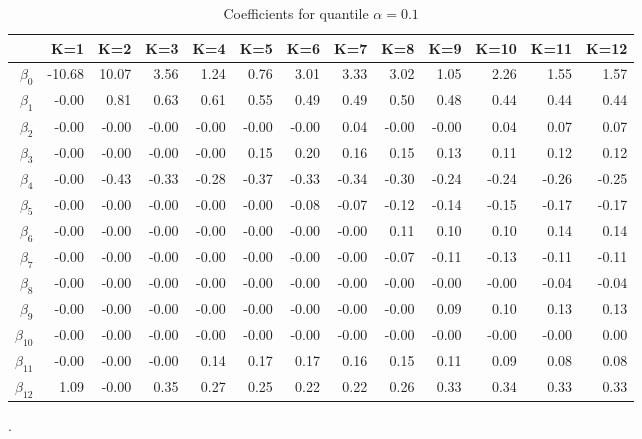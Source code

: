 \begin{table}[ht]
\centering
\begin{tabular}{rrrrrrrrrrrrr}
  \hline
 & K=1 & K=2 & K=3 & K=4 & K=5 & K=6 & K=7 & K=8 & K=9 & K=10 & K=11 & K=12 \\ 
  \hline
$\beta_{0}$ & -10.68 & 10.07 & 3.56 & 1.24 & 0.76 & 3.01 & 3.33 & 3.02 & 1.05 & 2.26 & 1.55 & 1.57 \\ 
  $\beta_{1}$ & -0.00 & 0.81 & 0.63 & 0.61 & 0.55 & 0.49 & 0.49 & 0.50 & 0.48 & 0.44 & 0.44 & 0.44 \\ 
  $\beta_{2}$ & -0.00 & -0.00 & -0.00 & -0.00 & -0.00 & -0.00 & 0.04 & -0.00 & -0.00 & 0.04 & 0.07 & 0.07 \\ 
  $\beta_{3}$ & -0.00 & -0.00 & -0.00 & -0.00 & 0.15 & 0.20 & 0.16 & 0.15 & 0.13 & 0.11 & 0.12 & 0.12 \\ 
  $\beta_{4}$ & -0.00 & -0.43 & -0.33 & -0.28 & -0.37 & -0.33 & -0.34 & -0.30 & -0.24 & -0.24 & -0.26 & -0.25 \\ 
  $\beta_{5}$ & -0.00 & -0.00 & -0.00 & -0.00 & -0.00 & -0.08 & -0.07 & -0.12 & -0.14 & -0.15 & -0.17 & -0.17 \\ 
  $\beta_{6}$ & -0.00 & -0.00 & -0.00 & -0.00 & -0.00 & -0.00 & -0.00 & 0.11 & 0.10 & 0.10 & 0.14 & 0.14 \\ 
  $\beta_{7}$ & -0.00 & -0.00 & -0.00 & -0.00 & -0.00 & -0.00 & -0.00 & -0.07 & -0.11 & -0.13 & -0.11 & -0.11 \\ 
  $\beta_{8}$ & -0.00 & -0.00 & -0.00 & -0.00 & -0.00 & -0.00 & -0.00 & -0.00 & -0.00 & -0.00 & -0.04 & -0.04 \\ 
  $\beta_{9}$ & -0.00 & -0.00 & -0.00 & -0.00 & -0.00 & -0.00 & -0.00 & -0.00 & 0.09 & 0.10 & 0.13 & 0.13 \\ 
  $\beta_{10}$ & -0.00 & -0.00 & -0.00 & -0.00 & -0.00 & -0.00 & -0.00 & -0.00 & -0.00 & -0.00 & -0.00 & 0.00 \\ 
  $\beta_{11}$ & -0.00 & -0.00 & -0.00 & 0.14 & 0.17 & 0.17 & 0.16 & 0.15 & 0.11 & 0.09 & 0.08 & 0.08 \\ 
  $\beta_{12}$ & 1.09 & -0.00 & 0.35 & 0.27 & 0.25 & 0.22 & 0.22 & 0.26 & 0.33 & 0.34 & 0.33 & 0.33 \\ 
   \hline
\end{tabular}
\caption{Coefficients for quantile $\alpha = 0.1$}.
\end{table}
